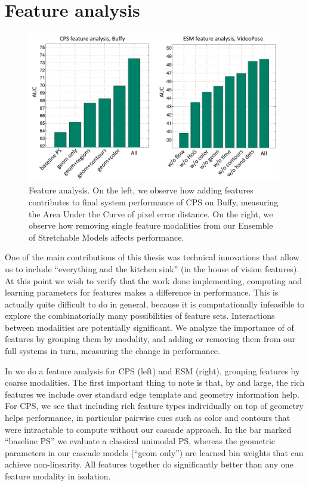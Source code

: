 \section{Feature analysis}
\begin{figure}[tb]
\begin{center}
\includegraphics[width=0.99\textwidth]{figs/ablative-bars}
\caption[Feature analysis.]{Feature analysis.  On the left, we observe how 
adding features contributes to final system performance of CPS on Buffy, 
measuring the Area Under the Curve of pixel error distance.  On the right, we 
observe how removing single feature modalities from our Ensemble of Stretchable 
Models affects performance.}
\label{fig:ablative}
\end{center}
\end{figure}

One of the main contributions of this thesis was technical innovations that 
allow us to include ``everything and the kitchen sink'' (in the house of vision 
features).  At this point we wish to verify that the work done implementing, 
computing and learning parameters for features makes a difference in 
performance.  This is actually quite difficult to do in general, because it is 
computationally infeasible to explore the combinatorially many possibilities of 
feature sets. Interactions between modalities are potentially significant.  We 
analyze the importance of of features by grouping them by modality, and adding 
or removing them from our full systems in turn, measuring the change in 
performance.

In  we do a feature analysis for CPS (left) and ESM (right), 
grouping features by coarse modalities.  The first important thing to note is 
that, by and large, the rich features we include over standard edge template 
and geometry information help.  For CPS, we see that including rich feature 
types individually on top of geometry helps performance, in particular pairwise 
cues such as color and contours that were intractable to compute without our 
cascade approach.  In the bar marked ``baseline PS'' we evaluate a classical 
unimodal PS, whereas the geometric parameters in our cascade models (``geom 
only'') are learned bin weights that can achieve non-linearity.  All features 
together do significantly better than any one feature modality in isolation.

